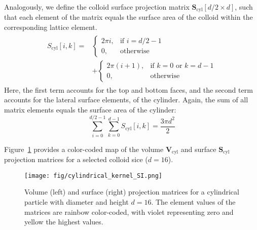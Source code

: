 \documentclass[10pt, a4paper]{article}
\begin{document}
\begin{multicols}{2}
Analogously, we define the colloid surface projection matrix $\bm{S}_{\text{cyl}}[d/2 \times d]$, such that each element of the matrix equals the surface area of the colloid within the corresponding lattice element.
\begin{align}
    \begin{split}
        S_{\text{cyl}}[i, k] = 
        &\begin{cases}
            2 \pi i,   & \text{if } i = d/2 - 1 \\
            0,         & \text{otherwise}
        \end{cases}
        \\
        &+
        \begin{cases}
            2 \pi (i + 1), & \text{if } k = 0 \text{ or } k = d - 1 \\
            0,             & \text{otherwise}
        \end{cases}
    \end{split}
\end{align}
Here, the first term accounts for the top and bottom faces, and the second term accounts for the lateral surface elements, of the cylinder.
Again, the sum of all matrix elements equals the surface area of the cylinder:
\begin{equation}
    \sum_{i=0}^{d/2 - 1} \sum_{k=0}^{d - 1} S_{\text{cyl}}[i, k] = \frac{3 \pi d^2}{2}
\end{equation}

Figure~\ref{fig:cylindrical_kernel_SI} provides a color-coded map of the volume $\bm{V}_{\text{cyl}}$ and surface $\bm{S}_{\text{cyl}}$ projection matrices for a selected colloid sice ($d = 16$).

\begin{figure}[H]
    \centering
    \texttt{[image: fig/cylindrical\_kernel\_SI.png]}
    \caption{
    Volume (left) and surface (right) projection matrices for a cylindrical particle with diameter and height $d = 16$. The element values of the matrices are rainbow color-coded, with violet representing zero and yellow the highest values.
    }
    \label{fig:cylindrical_kernel_SI}
\end{figure}


\end{multicols}
\end{document}
